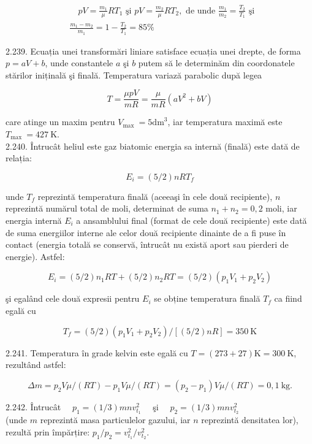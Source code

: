 \documentclass[10pt]{article}
\begin{document}
$$
\begin{aligned}
& \quad p V=\frac{m_{1}}{\mu} R T_{1} \text { şi } p V=\frac{m_{2}}{\mu} R T_{2}, \text { de unde } \frac{m_{1}}{m_{2}}=\frac{T_{2}}{T_{1}} \text { şi } \\
& \frac{m_{1}-m_{2}}{m_{1}}=1-\frac{T_{2}}{T_{1}}=85 \%
\end{aligned}
$$

2.239. Ecuația unei transformări liniare satisface ecuația unei drepte, de forma $p=a V+b$, unde constantele $a$ şi $b$ putem să le determinăm din coordonatele stărilor iniținală şi finală. Temperatura variază parabolic după legea

$$
T=\frac{\mu p V}{m R}=\frac{\mu}{m R}\left(a V^{2}+b V\right)
$$

care atinge un maxim pentru $V_{\text {max }}=5 \mathrm{dm}^{3}$, iar temperatura maximă este $T_{\text {max }}=427 \mathrm{~K}$.\\
2.240. Întrucât heliul este gaz biatomic energia sa internă (finală) este dată de relația:

$$
E_{i}=(5 / 2) n R T_{f}
$$

unde $T_{f}$ reprezintă temperatura finală (aceeaşi în cele două recipiente), $n$ reprezintă numărul total de moli, determinat de suma $n_{1}+n_{2}=0,2$ moli, iar energia internă $E_{i}$ a ansamblului final (format de cele două recipiente) este dată de suma energiilor interne ale celor două recipiente dinainte de a fi puse în contact (energia totală se conservă, întrucât nu există aport sau pierderi de energie). Astfel:

$$
E_{i}=(5 / 2) n_{1} R T+(5 / 2) n_{2} R T=(5 / 2)\left(p_{1} V_{1}+p_{2} V_{2}\right)
$$

şi egalând cele două expresii pentru $E_{i}$ se obține temperatura finală $T_{f}$ ca fiind egală cu

$$
T_{f}=(5 / 2)\left(p_{1} V_{1}+p_{2} V_{2}\right) /[(5 / 2) n R]=350 \mathrm{~K}
$$

2.241. Temperatura în grade kelvin este egală cu $T=(273+27) \mathrm{K}=300 \mathrm{~K}$, rezultând astfel:

$$
\Delta m=p_{2} V \mu /(R T)-p_{1} V \mu /(R T)=\left(p_{2}-p_{1}\right) V \mu /(R T)=0,1 \mathrm{~kg} .
$$

2.242. Întrucât $\quad p_{1}=(1 / 3) m n v_{t_{1}}^{2} \quad$ şi $\quad p_{2}=(1 / 3) m n v_{t_{2}}^{2}$\\
(unde $m$ reprezintă masa particulelor gazului, iar $n$ reprezintă densitatea lor), rezultă prin împărțire: $p_{1} / p_{2}=v_{t_{1}}^{2} / v_{t_{2}}^{2}$.
\end{document}
